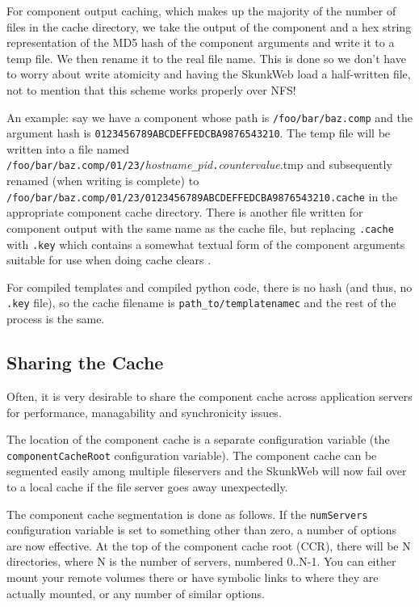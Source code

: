 \documentclass[titlepage]{manual}
\begin{document}
For component output caching, which makes up the majority of the
number of files in the cache directory, we take the output of the
component and a hex string representation of the MD5 hash of the
component arguments and write it to a temp file. We then rename it
to the real file name. This is done so we don't have to worry about
write atomicity and having the SkunkWeb load a half-written file,
not to mention that this scheme works properly over NFS!

An example: say we have a component whose path is
\texttt{/foo/bar/baz.comp} and the argument hash is
\texttt{0123456789ABCDEFFEDCBA9876543210}. The temp file will be
written into a file named
\texttt{/foo/bar/baz.comp/01/23/}\emph{hostname}\texttt{\_}\emph{pid}\texttt{.}\emph{countervalue}.tmp
and subsequently renamed (when writing is complete) to
\texttt{/foo/bar/baz.comp/01/23/0123456789ABCDEFFEDCBA9876543210.cache}
in the appropriate component cache directory. There is another file
written for component output with the same name as the cache file, but
replacing \texttt{.cache} with \texttt{.key} which contains a somewhat
textual form of the component arguments suitable for use when doing
cache clears .

For compiled templates and compiled python code, there is no hash (and
thus, no \texttt{.key} file), so the cache filename is
\texttt{path\_to/templatenamec} and the rest of the process is the
same.

\subsection{Sharing the Cache}
Often, it is very desirable to share the component cache across
application servers for performance, managability and synchronicity
issues. 

The location of the component cache is a separate configuration
variable (the \texttt{componentCacheRoot} configuration variable). The
component cache can be segmented easily among multiple fileservers and
the SkunkWeb will now fail over to a local cache if the file server
goes away unexpectedly.
   
The component cache segmentation is done as follows. If the \texttt{numServers}
configuration variable is set to something other than zero, a number
of options are now effective. At the top of the component cache root
(CCR), there will be N directories, where N is the number of servers,
numbered 0..N-1. You can either mount your remote volumes there or
have symbolic links to where they are actually mounted, or any number
of similar options.
   
\end{document}
